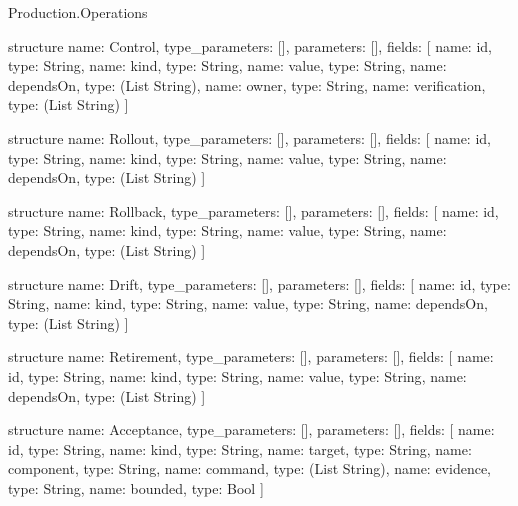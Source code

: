 \begin{lexlean}{Production.Operations}
\begin{semanticmodule}
structure{
  name: Control,
  type_parameters: [],
  parameters: [],
  fields: [
    {name: id, type: String},
    {name: kind, type: String},
    {name: value, type: String},
    {name: dependsOn, type: (List String)},
    {name: owner, type: String},
    {name: verification, type: (List String)}
  ]
}

structure{
  name: Rollout,
  type_parameters: [],
  parameters: [],
  fields: [
    {name: id, type: String},
    {name: kind, type: String},
    {name: value, type: String},
    {name: dependsOn, type: (List String)}
  ]
}

structure{
  name: Rollback,
  type_parameters: [],
  parameters: [],
  fields: [
    {name: id, type: String},
    {name: kind, type: String},
    {name: value, type: String},
    {name: dependsOn, type: (List String)}
  ]
}

structure{
  name: Drift,
  type_parameters: [],
  parameters: [],
  fields: [
    {name: id, type: String},
    {name: kind, type: String},
    {name: value, type: String},
    {name: dependsOn, type: (List String)}
  ]
}

structure{
  name: Retirement,
  type_parameters: [],
  parameters: [],
  fields: [
    {name: id, type: String},
    {name: kind, type: String},
    {name: value, type: String},
    {name: dependsOn, type: (List String)}
  ]
}

structure{
  name: Acceptance,
  type_parameters: [],
  parameters: [],
  fields: [
    {name: id, type: String},
    {name: kind, type: String},
    {name: target, type: String},
    {name: component, type: String},
    {name: command, type: (List String)},
    {name: evidence, type: String},
    {name: bounded, type: Bool}
  ]
}
\end{semanticmodule}
\end{lexlean}
